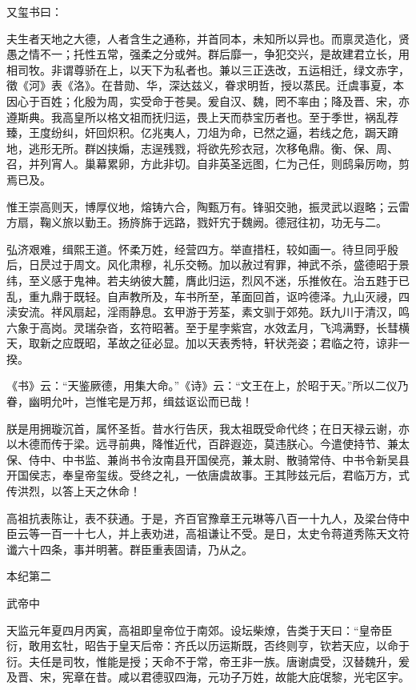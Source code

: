 \documentclass[12pt,UTF8]{ctexbook}
\begin{document}
又玺书曰：

夫生者天地之大德，人者含生之通称，并首同本，未知所以异也。而禀灵造化，贤愚之情不一；托性五常，强柔之分或舛。群后靡一，争犯交兴，是故建君立长，用相司牧。非谓尊骄在上，以天下为私者也。兼以三正迭改，五运相迁，绿文赤字，徵《河》表《洛》。在昔勋、华，深达兹义，眷求明哲，授以蒸民。迁虞事夏，本因心于百姓；化殷为周，实受命于苍昊。爰自汉、魏，罔不率由；降及晋、宋，亦遵斯典。我高皇所以格文祖而抚归运，畏上天而恭宝历者也。至于季世，祸乱荐臻，王度纷纠，奸回炽积。亿兆夷人，刀俎为命，已然之逼，若线之危，跼天蹐地，逃形无所。群凶挟煽，志逞残戮，将欲先殄衣冠，次移龟鼎。衡、保、周、召，并列宵人。巢幕累卵，方此非切。自非英圣远图，仁为己任，则鸱枭厉吻，剪焉已及。

惟王崇高则天，博厚仪地，熔铸六合，陶甄万有。锋驲交驰，振灵武以遐略；云雷方扇，鞠义旅以勤王。扬旍旆于远路，戮奸宄于魏阙。德冠往初，功无与二。

弘济艰难，缉熙王道。怀柔万姓，经营四方。举直措枉，较如画一。待旦同乎殷后，日昃过于周文。风化肃穆，礼乐交畅。加以赦过宥罪，神武不杀，盛德昭于景纬，至义感于鬼神。若夫纳彼大麓，膺此归运，烈风不迷，乐推攸在。治五韪于已乱，重九鼎于既轻。自声教所及，车书所至，革面回首，讴吟德泽。九山灭祲，四渎安流。祥风扇起，淫雨静息。玄甲游于芳荃，素文驯于郊苑。跃九川于清汉，鸣六象于高岗。灵瑞杂沓，玄符昭著。至于星孛紫宫，水效孟月，飞鸿满野，长彗横天，取新之应既昭，革故之征必显。加以天表秀特，轩状尧姿；君临之符，谅非一揆。

《书》云：“天鉴厥德，用集大命。”《诗》云：“文王在上，於昭于天。”所以二仪乃眷，幽明允叶，岂惟宅是万邦，缉兹讴讼而已哉！

朕是用拥璇沉首，属怀圣哲。昔水行告厌，我太祖既受命代终；在日天禄云谢，亦以木德而传于梁。远寻前典，降惟近代，百辟遐迩，莫违朕心。今遣使持节、兼太保、侍中、中书监、兼尚书令汝南县开国侯亮，兼太尉、散骑常侍、中书令新吴县开国侯志，奉皇帝玺绂。受终之礼，一依唐虞故事。王其陟兹元后，君临万方，式传洪烈，以答上天之休命！

高祖抗表陈让，表不获通。于是，齐百官豫章王元琳等八百一十九人，及梁台侍中臣云等一百一十七人，并上表劝进，高祖谦让不受。是日，太史令蒋道秀陈天文符谶六十四条，事并明著。群臣重表固请，乃从之。





本纪第二

武帝中

天监元年夏四月丙寅，高祖即皇帝位于南郊。设坛柴燎，告类于天曰：“皇帝臣衍，敢用玄牡，昭告于皇天后帝：齐氏以历运斯既，否终则亨，钦若天应，以命于衍。夫任是司牧，惟能是授；天命不于常，帝王非一族。唐谢虞受，汉替魏升，爰及晋、宋，宪章在昔。咸以君德驭四海，元功子万姓，故能大庇氓黎，光宅区宇。
\end{document}
